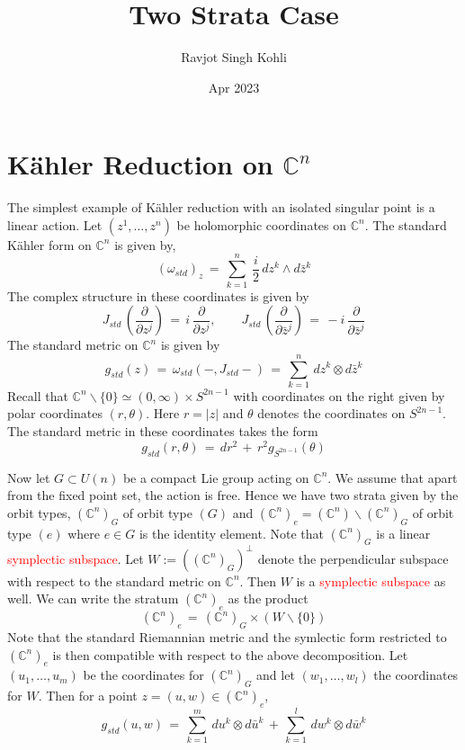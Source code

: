 \documentclass[a4paper,12pt]{article}
\title{Two Strata Case}
\author{Ravjot Singh Kohli}
\date{Apr 2023}
\newcommand{\C}{\mathbb{C}}
\newcommand{\red}[1]{\textcolor{red}{#1}}
\newcommand{\abs}[1]{\lvert #1 \rvert}
\begin{document}
	\maketitle
	
	\section{K\"ahler Reduction on $\C^n$}
	The simplest example of K\"ahler reduction with an isolated singular point is a linear action. Let $(z^1,\dots,z^n)$ be holomorphic coordinates on $\C^n$. The standard K\"ahler form on $\C^n$ is given by,
	\begin{equation}\label{standardkahler}
		(\omega_{std})_{z} \,=\,  \sum_{k=1}^n \, \frac{i}{2} \, dz^k \wedge d\bar{z}^k
	\end{equation}
	The complex structure in these coordinates is given by 
	\begin{equation}
		J_{std}\, \left(\frac{\partial}{\partial z^j} \right) \,=\, i \, \frac{\partial}{\partial z^j}, \qquad J_{std}\, \left( \frac{\partial}{\partial \bar{z}^j} \right) \,=\, -i \, \frac{\partial}{\partial \bar{z}^j}
	\end{equation}
	The standard metric on $\C^n$ is given by
	\begin{equation}
		g_{std}(z) \,=\, \omega_{std}(-,J_{std}-) \,=\, \sum_{k=1}^n \, dz^k \otimes d\bar{z}^k
	\end{equation}
	Recall that $\C^n\backslash\{0\} \simeq (0,\infty) \times S^{2n-1}$ with coordinates on the right given by polar coordinates $(r,\theta)$. Here $r = \abs{z}$ and $\theta$ denotes the coordinates on $S^{2n-1}$.
	The standard metric in these coordinates takes the form
	\begin{equation}
		g_{std}(r,\theta) \,=\, dr^2 \,+\, r^2 g_{S^{2n-1}}(\theta)
	\end{equation}
	
	Now let $G\subset U(n)$ be a compact Lie group acting on $\C^n$. We assume that apart from the fixed point set, the action is free. Hence we have two strata given by the orbit types, $(\C^n)_G$ of orbit type $(G)$ and $(\C^n)_e=(\C^n)\backslash (\C^n)_{G}$ of orbit type $(e)$ where $e\in G$ is the identity element. Note that $(\C^n)_G$ is a linear \red{symplectic subspace}. Let $W:= ((\C^n)_G)^\perp$ denote the perpendicular subspace with respect to the standard metric on $\C^n$. Then $W$ is a \red{symplectic subspace} as well.
	We can write the stratum $(\C^n)_e$ as the product
	\begin{equation}
		(\C^n)_e \,=\, (\C^n)_G \times (W \backslash\{0\})
	\end{equation}
	Note that the standard Riemannian metric and the symlectic form restricted to $(\C^n)_e$ is then compatible with respect to the above decomposition. Let $(u_1,\dots, u_m)$ be the coordinates for $(\C^n)_G$ and let $(w_1,\dots,w_l)$ the coordinates for $W$. Then for a point $z=(u,w)\in (\C^n)_e$,
	\begin{equation}
		g_{std} (u,w) \,=\, \sum_{k=1}^m \, du^k \otimes d\bar{u}^k \,+\, \sum_{k=1}^l \, dw^k \otimes d\bar{w}^k
	\end{equation} 
	
\end{document}
